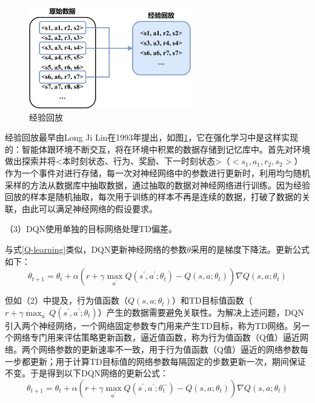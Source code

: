 \begin{figure}[htbp]
    \centering
    \includegraphics[width=0.63\textwidth]{images/chapter2/Experience_Replay.png}
    \caption{经验回放}\label{经验回放} %
\end{figure}

经验回放最早由Long Ji Lin在1993年提出\cite{1992Reinforcement}，如图\ref{经验回放}，它在强化学习中是这样实现的：智能体跟环境不断交互，将在环境中积累的数据存储到记忆库中。首先对环境做出探索并将<本时刻状态、行为、奖励、下一时刻状态>（$<s_1, a_1, r_2, s_2>$）作为一个事件对进行存储，每一次对神经网络中的参数进行更新时，利用均匀随机采样的方法从数据库中抽取数据，通过抽取的数据对神经网络进行训练。因为经验回放的样本是随机抽取，每次用于训练的样本不再是连续的数据，打破了数据的关联，由此可以满足神经网络的假设要求。

（3）DQN使用单独的目标网络处理TD偏差。

与式\ref{Q-learning}类似，DQN更新神经网络的参数$\theta$采用的是梯度下降法。更新公式如下：
\begin{equation*}
    \theta_{t+1} = \theta_t + \alpha (r + \gamma \max_{a^{'}} Q(s^{'}, a^{'}; \theta_t) - Q(s, a; \theta_t))\nabla   Q(s, a; \theta_t)
\end{equation*}

但如（2）中提及，行为值函数（$Q(s, a; \theta_t)$）和TD目标值函数（$r + \gamma \max_{a^{'}} Q(s^{'}, a^{'}; \theta_t)$）产生的数据需要避免关联性。为解决上述问题，DQN引入两个神经网络，一个网络固定参数专门用来产生TD目标，称为TD网络。另一个网络专门用来评估策略更新函数，逼近值函数，称为行为值函数（Q值）逼近网络。两个网络参数的更新速率不一致，用于行为值函数（Q值）逼近的网络参数每一步都更新；用于计算TD目标值的网络参数每隔固定的步数更新一次，期间保证不变。于是得到以下DQN网络的更新公式：
\begin{equation}\label{DQN}
    \theta_{t+1} = \theta_t + \alpha (r + \gamma \max_{a^{'}} Q(s^{'}, a^{'}; \theta_t^{-}) - Q(s, a; \theta_t))\nabla   Q(s, a; \theta_t)
\end{equation}

